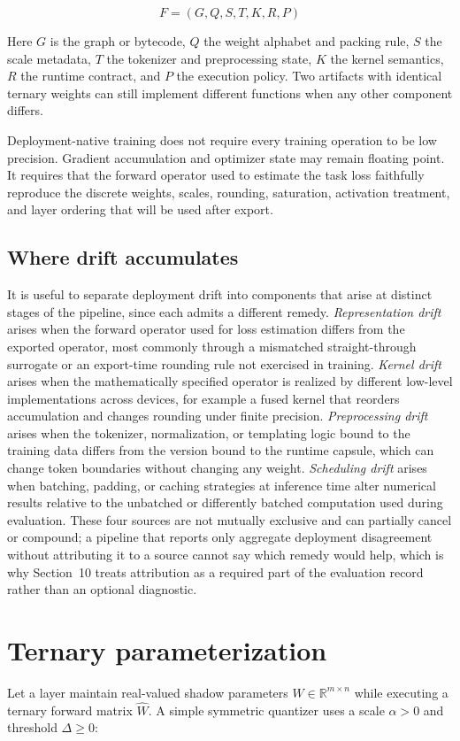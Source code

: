 \documentclass[11pt]{article}
\begin{document}
\[
F = (G, Q, S, T, K, R, P)
\]

Here $G$ is the graph or bytecode, $Q$ the weight alphabet and packing rule, $S$ the scale metadata, $T$ the tokenizer and preprocessing state, $K$ the kernel semantics, $R$ the runtime contract, and $P$ the execution policy. Two artifacts with identical ternary weights can still implement different functions when any other component differs.

Deployment-native training does not require every training operation to be low precision. Gradient accumulation and optimizer state may remain floating point. It requires that the forward operator used to estimate the task loss faithfully reproduce the discrete weights, scales, rounding, saturation, activation treatment, and layer ordering that will be used after export.

\subsection{Where drift accumulates}
It is useful to separate deployment drift into components that arise at distinct stages of the pipeline, since each admits a different remedy. \emph{Representation drift} arises when the forward operator used for loss estimation differs from the exported operator, most commonly through a mismatched straight-through surrogate or an export-time rounding rule not exercised in training. \emph{Kernel drift} arises when the mathematically specified operator is realized by different low-level implementations across devices, for example a fused kernel that reorders accumulation and changes rounding under finite precision. \emph{Preprocessing drift} arises when the tokenizer, normalization, or templating logic bound to the training data differs from the version bound to the runtime capsule, which can change token boundaries without changing any weight. \emph{Scheduling drift} arises when batching, padding, or caching strategies at inference time alter numerical results relative to the unbatched or differently batched computation used during evaluation. These four sources are not mutually exclusive and can partially cancel or compound; a pipeline that reports only aggregate deployment disagreement without attributing it to a source cannot say which remedy would help, which is why Section~10 treats attribution as a required part of the evaluation record rather than an optional diagnostic.

\section{Ternary parameterization}
Let a layer maintain real-valued shadow parameters $W \in \mathbb{R}^{m\times n}$ while executing a ternary forward matrix $\hat{W}$. A simple symmetric quantizer uses a scale $\alpha > 0$ and threshold $\Delta \geq 0$:
\end{document}
